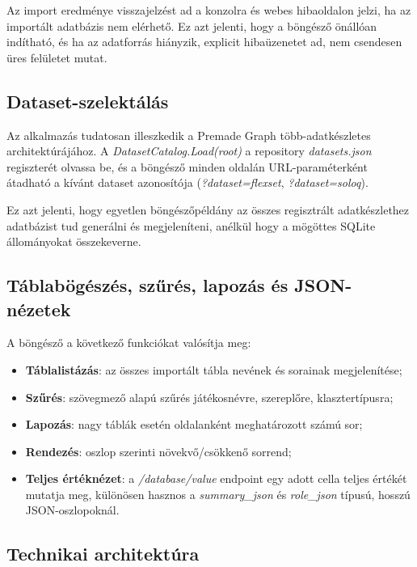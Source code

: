 Az import eredménye visszajelzést ad a konzolra és webes hibaoldalon jelzi, ha az importált adatbázis nem elérhető. Ez azt jelenti, hogy a böngésző önállóan indítható, és ha az adatforrás hiányzik, explicit hibaüzenetet ad, nem csendesen üres felületet mutat.

\subsection{Dataset-szelektálás}

Az alkalmazás tudatosan illeszkedik a Premade Graph több-adatkészletes architektúrájához. A \textit{DatasetCatalog.Load(root)} a repository \textit{datasets.json} regiszterét olvassa be, és a böngésző minden oldalán URL-paraméterként átadható a kívánt dataset azonosítója (\textit{?dataset=flexset}, \textit{?dataset=soloq}).

Ez azt jelenti, hogy egyetlen böngészőpéldány az összes regisztrált adatkészlethez adatbázist tud generálni és megjeleníteni, anélkül hogy a mögöttes SQLite állományokat összekeverne.

\subsection{Táblabögészés, szűrés, lapozás és JSON-nézetek}

A böngésző a következő funkciókat valósítja meg:

\begin{itemize}
    \item \textbf{Táblalistázás}: az összes importált tábla nevének és sorainak megjelenítése;
    \item \textbf{Szűrés}: szövegmező alapú szűrés játékosnévre, szereplőre, klasztertípusra;
    \item \textbf{Lapozás}: nagy táblák esetén oldalanként meghatározott számú sor;
    \item \textbf{Rendezés}: oszlop szerinti növekvő/csökkenő sorrend;
    \item \textbf{Teljes értéknézet}: a \textit{/database/value} endpoint egy adott cella teljes értékét mutatja meg, különösen hasznos a \textit{summary\_json} és \textit{role\_json} típusú, hosszú JSON-oszlopoknál.
\end{itemize}

\subsection{Technikai architektúra}

